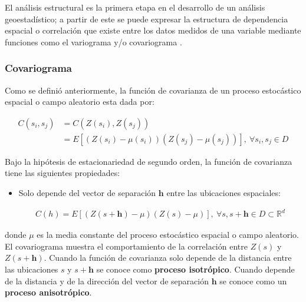 \documentclass[
]{book}
\begin{document}
El análisis estructural es la primera etapa en el desarrollo de un análisis geoestadístico; a partir de este se puede expresar la estructura de dependencia espacial o correlación que existe entre los datos medidos de una variable mediante funciones como el variograma y/o covariograma \citep{Ramon}.

\hypertarget{covariograma}{%
\subsubsection*{Covariograma}\label{covariograma}}

Como se definió anteriormente, la función de covarianza de un proceso estocástico espacial o campo aleatorio esta dada por:

\begin{align}
    C(s_i,s_j)&=C(Z(s_i),Z(s_j))\\
    &= E[(Z(s_i)-\mu(s_i)) (Z(s_j)-\mu(s_j))],\ \forall s_i,s_j\in D
\end{align}

Bajo la hipótesis de estacionariedad de segundo orden, la función de covarianza tiene las siguientes propiedades:

\begin{itemize}
\item
  Solo depende del vector de separación \(\textbf{h}\) entre las ubicaciones espaciales:

  \begin{align}
      C(h)=E[(Z(s+\textbf{h})-\mu)(Z(s)-\mu)],\ \forall s,s+\textbf{h} \in D\subset \mathbb{R}^d  
    \end{align}
\end{itemize}

donde \(\mu\) es la media constante del proceso estocástico espacial o campo aleatorio. El covariograma muestra el comportamiento de la correlación entre \(Z(s)\) y \(Z(s+\textbf{h})\). Cuando la función de covarianza solo depende de la distancia entre las ubicaciones \(s\) y \(s+\textbf{h}\) se conoce como \textbf{proceso isotrópico}. Cuando depende de la distancia y de la dirección del vector de separación \(\textbf{h}\) se conoce como un \textbf{proceso anisotrópico}.
\end{document}
